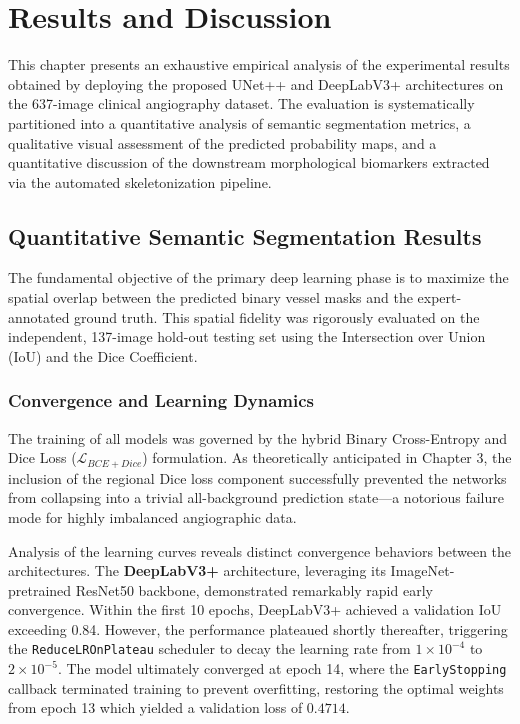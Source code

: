 \chapter{Results and Discussion}
\label{ch:results_and_discussion}

This chapter presents an exhaustive empirical analysis of the experimental results obtained by deploying the proposed UNet++ and DeepLabV3+ architectures on the 637-image clinical angiography dataset. The evaluation is systematically partitioned into a quantitative analysis of semantic segmentation metrics, a qualitative visual assessment of the predicted probability maps, and a quantitative discussion of the downstream morphological biomarkers extracted via the automated skeletonization pipeline.

\section{Quantitative Semantic Segmentation Results}
The fundamental objective of the primary deep learning phase is to maximize the spatial overlap between the predicted binary vessel masks and the expert-annotated ground truth. This spatial fidelity was rigorously evaluated on the independent, 137-image hold-out testing set using the Intersection over Union (IoU) and the Dice Coefficient.

\subsection{Convergence and Learning Dynamics}
The training of all models was governed by the hybrid Binary Cross-Entropy and Dice Loss ($\mathcal{L}_{BCE+Dice}$) formulation. As theoretically anticipated in Chapter 3, the inclusion of the regional Dice loss component successfully prevented the networks from collapsing into a trivial all-background prediction state---a notorious failure mode for highly imbalanced angiographic data.

Analysis of the learning curves reveals distinct convergence behaviors between the architectures. The \textbf{DeepLabV3+} architecture, leveraging its ImageNet-pretrained ResNet50 backbone, demonstrated remarkably rapid early convergence. Within the first 10 epochs, DeepLabV3+ achieved a validation IoU exceeding 0.84. However, the performance plateaued shortly thereafter, triggering the \texttt{ReduceLROnPlateau} scheduler to decay the learning rate from $1 \times 10^{-4}$ to $2 \times 10^{-5}$. The model ultimately converged at epoch 14, where the \texttt{EarlyStopping} callback terminated training to prevent overfitting, restoring the optimal weights from epoch 13 which yielded a validation loss of $0.4714$.

